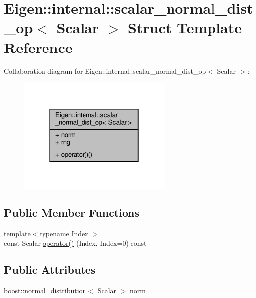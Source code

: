 \hypertarget{structEigen_1_1internal_1_1scalar__normal__dist__op}{}\section{Eigen\+:\+:internal\+:\+:scalar\+\_\+normal\+\_\+dist\+\_\+op$<$ Scalar $>$ Struct Template Reference}
\label{structEigen_1_1internal_1_1scalar__normal__dist__op}


Collaboration diagram for Eigen\+:\+:internal\+:\+:scalar\+\_\+normal\+\_\+dist\+\_\+op$<$ Scalar $>$\+:\nopagebreak
\begin{figure}[H]
\begin{center}
\leavevmode
\includegraphics[width=214pt]{d3/d9a/structEigen_1_1internal_1_1scalar__normal__dist__op__coll__graph}
\end{center}
\end{figure}
\subsection*{Public Member Functions}
\begin{DoxyCompactItemize}
\item 
{\footnotesize template$<$typename Index $>$ }\\const Scalar \hyperlink{structEigen_1_1internal_1_1scalar__normal__dist__op_ac4016ae27250ae077c5ecc58465454ce}{operator()} (Index, Index=0) const
\end{DoxyCompactItemize}
\subsection*{Public Attributes}
\begin{DoxyCompactItemize}
\item 
boost\+::normal\+\_\+distribution$<$ Scalar $>$ \hyperlink{structEigen_1_1internal_1_1scalar__normal__dist__op_a2838ee2b54942da88f385babd6b01bbf}{norm}
\end{DoxyCompactItemize}
